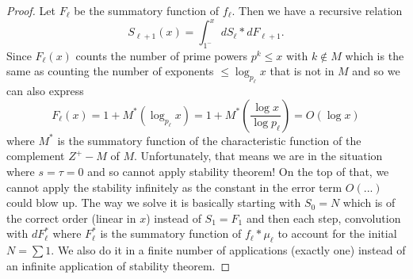 \documentclass[12pt]{article}
\begin{document}
\begin{proof}
Let $F_\ell$ be the summatory function of $f_\ell$. Then we have a recursive relation
$$S_{\ell+1}(x) = \int_{1^-}^x dS_\ell * dF_{\ell + 1}.$$ %
Since $F_\ell(x)$ counts the number of prime powers $p^k \leq x$ with $k \not\in M$ which is the same as counting the number of exponents $\leq \log_{p_\ell} x$ that is not in $M$ and so we can also express
$$F_\ell(x) = 1 + M^*(\log_{p_\ell} x) = 1 + M^*\left(\frac{\log x}{\log p_\ell}\right) = O(\log x)$$
where $M^*$ is the summatory function of the characteristic function of the complement $Z^+ - M$ of $M$. Unfortunately, that means we are in the situation where $s = \tau = 0$ and so cannot apply stability theorem! On the top of that, we cannot apply the stability infinitely as the constant in the error term $O(...)$ could blow up. The way we solve it is basically starting with $S_0 = N$ which is of the correct order (linear in $x$) instead of $S_1 = F_1$ and then each step, convolution with $dF^*_\ell$ where $F^*_\ell$ is the summatory function of $f_\ell * \mu_\ell$ to account for the initial $N = \sum 1$. We also do it in a finite number of applications (exactly one) instead of an infinite application of stability theorem.
\end{proof}

\unless\ifdefined\IsMainDocument
\end{document}
